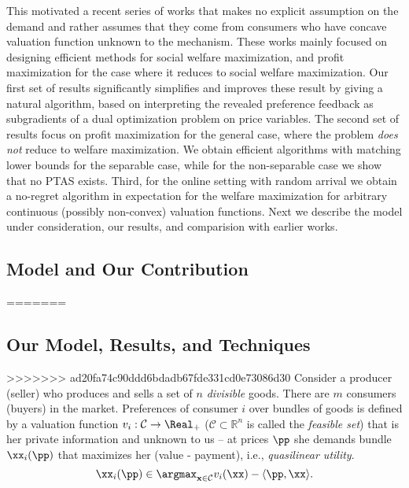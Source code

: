 This motivated a recent series of works \cite{roth papers} that makes no explicit assumption on the demand and rather assumes that they come from consumers who have concave valuation function unknown to the mechanism. These works mainly focused on designing efficient methods for social welfare maximization, and profit maximization for the case where it reduces to social welfare maximization. Our first set of results significantly simplifies and improves these result by giving a natural algorithm, based on interpreting the revealed preference feedback as subgradients of a dual optimization problem on price variables. %
The second set of results focus on profit maximization for the general case, where the problem {\em does not} reduce to welfare maximization. We obtain efficient algorithms with matching lower bounds for the separable case, while for the non-separable case we show that no PTAS exists. Third, for the online setting with random arrival we obtain a no-regret algorithm in expectation for the welfare maximization for arbitrary continuous (possibly non-convex) valuation functions. Next we describe the model under consideration, our results, and \alert{comparision with earlier works}.

\subsection{Model and Our Contribution}
=======

\subsection{Our Model, Results, and Techniques}
>>>>>>> ad20fa74c90ddd6bdadb67fde331cd0e73086d30
Consider a producer (seller) who produces and sells a set of $n$ \emph{divisible} goods. There are $m$ consumers (buyers) in the market. %
Preferences of consumer $i$ over bundles of goods is defined by a valuation function $v_i:\mathcal{C} \rightarrow \Real_+$ ($\mathcal{C}\subset \mathbb{R}^n$ is called the \emph{feasible set}) that is her private information and unknown to us -- at prices $\pp$ she demands bundle $\xx_i(\pp)$ that maximizes her (value - payment), i.e., {\em quasilinear utility}.
\begin{equation}\label{eq:optbundle}
\xx_i(\pp) \in \argmax_{\mathbf{x}\in \mathcal{C}} v_i(\xx) - \langle \pp, \xx\rangle.
\end{equation}

